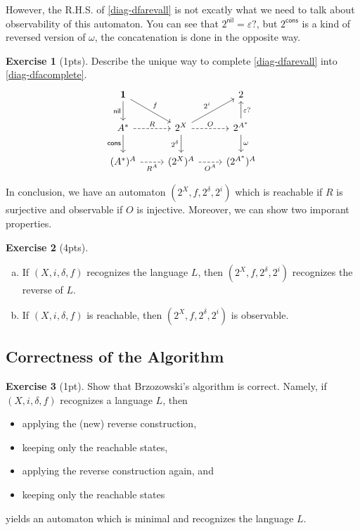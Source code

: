 \documentclass{article}
\theoremstyle{definition}
\newtheorem{exer}{Exercise}
\theoremstyle{remark}
\begin{document}
However, the R.H.S. of \eqref{diag-dfarevall} is not excatly what we need to talk about observability of this automaton. You can see that $2^{\textsf{nil}} = \varepsilon?$, but $2^{\textsf{cons}}$ is a kind of reversed version of $\omega$, the concatenation is done in the opposite way.
\begin{exer}[1pts]
    Describe the unique way to complete \eqref{diag-dfarevall} into \eqref{diag-dfacomplete}.
    \begin{equation}\label{diag-dfacomplete}
    \begin{tikzcd}
    \mathbf{1} \arrow[rd, "f"] \arrow[d, "\textsf{nil}"'] & & 2 \\
    A^* \arrow[d, "\textsf{cons}"'] \arrow[r, "R", dashed] & 2^X \arrow[ru, "2^i"] \arrow[d, "2^{\delta}"'] \arrow[r, "O", dashed] & 2^{A^*} \arrow[u, "\varepsilon?"'] \arrow[d, "\omega"] \\
    (A^*)^A \arrow[r, "R^A"', dashed] & (2^X)^A \arrow[r, "O^A"', dashed] & (2^{A^*})^A 
    \end{tikzcd}
    \end{equation}
\end{exer}
In conclusion, we have an automaton $(2^X, f, 2^{\delta}, 2^i)$ which is reachable if $R$ is surjective and observable if $O$ is injective. Moreover, we can show two imporant properties.

\begin{exer}[4pts]
    \begin{enumerate}[(a)]
        \item If $(X, i, \delta, f)$ recognizes the language $L$, then $(2^X, f, 2^{\delta}, 2^i)$ recognizes the reverse of $L$.
        \item If $(X, i, \delta, f)$ is reachable, then $(2^X, f, 2^{\delta}, 2^i)$ is observable.
    \end{enumerate}
\end{exer}

\subsection{Correctness of the Algorithm}
\begin{exer}[1pt]
    Show that Brzozowski's algorithm is correct. Namely, if $(X,i, \delta, f)$ recognizes a language $L$, then
    \begin{itemize}
        \item applying the (new) reverse construction, 
        \item keeping only the reachable states,
        \item applying the reverse construction again, and
        \item keeping only the reachable states
    \end{itemize}
    yields an automaton which is minimal and recognizes the language $L$.
\end{exer}
\end{document}
